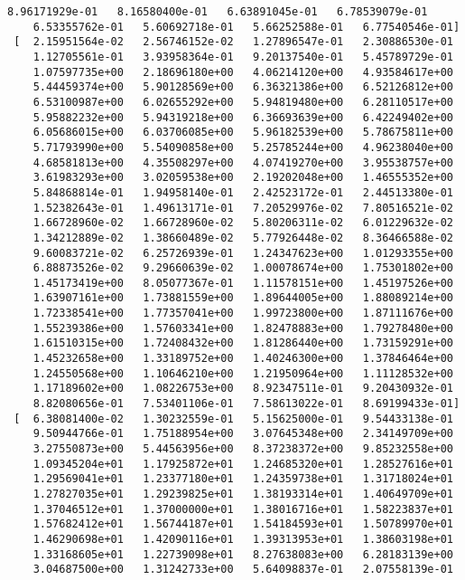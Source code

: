 \documentclass{article}
\begin{document}
\begin{Verbatim}[commandchars=\\\{\}]
    8.96171929e-01   8.16580400e-01   6.63891045e-01   6.78539079e-01
    6.53355762e-01   5.60692718e-01   5.66252588e-01   6.77540546e-01]
 [  2.15951564e-02   2.56746152e-02   1.27896547e-01   2.30886530e-01
    1.12705561e-01   3.93958364e-01   9.20137540e-01   5.45789729e-01
    1.07597735e+00   2.18696180e+00   4.06214120e+00   4.93584617e+00
    5.44459374e+00   5.90128569e+00   6.36321386e+00   6.52126812e+00
    6.53100987e+00   6.02655292e+00   5.94819480e+00   6.28110517e+00
    5.95882232e+00   5.94319218e+00   6.36693639e+00   6.42249402e+00
    6.05686015e+00   6.03706085e+00   5.96182539e+00   5.78675811e+00
    5.71793990e+00   5.54090858e+00   5.25785244e+00   4.96238040e+00
    4.68581813e+00   4.35508297e+00   4.07419270e+00   3.95538757e+00
    3.61983293e+00   3.02059538e+00   2.19202048e+00   1.46555352e+00
    5.84868814e-01   1.94958140e-01   2.42523172e-01   2.44513380e-01
    1.52382643e-01   1.49613171e-01   7.20529976e-02   7.80516521e-02
    1.66728960e-02   1.66728960e-02   5.80206311e-02   6.01229632e-02
    1.34212889e-02   1.38660489e-02   5.77926448e-02   8.36466588e-02
    9.60083721e-02   6.25726939e-01   1.24347623e+00   1.01293355e+00
    6.88873526e-02   9.29660639e-02   1.00078674e+00   1.75301802e+00
    1.45173419e+00   8.05077367e-01   1.11578151e+00   1.45197526e+00
    1.63907161e+00   1.73881559e+00   1.89644005e+00   1.88089214e+00
    1.72338541e+00   1.77357041e+00   1.99723800e+00   1.87111676e+00
    1.55239386e+00   1.57603341e+00   1.82478883e+00   1.79278480e+00
    1.61510315e+00   1.72408432e+00   1.81286440e+00   1.73159291e+00
    1.45232658e+00   1.33189752e+00   1.40246300e+00   1.37846464e+00
    1.24550568e+00   1.10646210e+00   1.21950964e+00   1.11128532e+00
    1.17189602e+00   1.08226753e+00   8.92347511e-01   9.20430932e-01
    8.82080656e-01   7.53401106e-01   7.58613022e-01   8.69199433e-01]
 [  6.38081400e-02   1.30232559e-01   5.15625000e-01   9.54433138e-01
    9.50944766e-01   1.75188954e+00   3.07645348e+00   2.34149709e+00
    3.27550873e+00   5.44563956e+00   8.37238372e+00   9.85232558e+00
    1.09345204e+01   1.17925872e+01   1.24685320e+01   1.28527616e+01
    1.29569041e+01   1.23377180e+01   1.24359738e+01   1.31718024e+01
    1.27827035e+01   1.29239825e+01   1.38193314e+01   1.40649709e+01
    1.37046512e+01   1.37000000e+01   1.38016716e+01   1.58223837e+01
    1.57682412e+01   1.56744187e+01   1.54184593e+01   1.50789970e+01
    1.46290698e+01   1.42090116e+01   1.39313953e+01   1.38603198e+01
    1.33168605e+01   1.22739098e+01   8.27638083e+00   6.28183139e+00
    3.04687500e+00   1.31242733e+00   5.64098837e-01   2.07558139e-01

\end{Verbatim}
\end{document}
